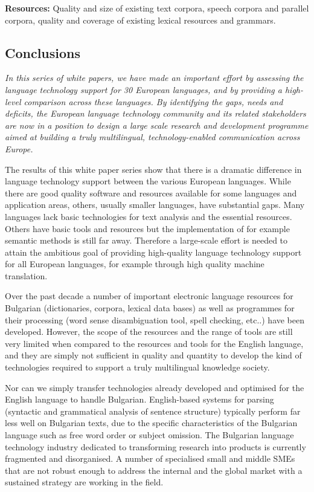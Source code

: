 \documentclass[]{../../metanetpaper}
\begin{document}
\begin{multicols}{2}
\textbf{Resources:} Quality and size of existing text corpora, speech corpora and parallel corpora, quality and coverage of existing lexical resources and grammars.

\subsection{Conclusions}

\emph{In this series of white papers, we have made an important effort by assessing the language technology support for 30 European languages, and by providing a high-level comparison across these languages. By identifying the gaps, needs and deficits, the European language technology community and its related stakeholders are now in a position to design a large scale research and development programme aimed at building a truly multilingual, technology-enabled communication across Europe.}

The results of this white paper series show that there is a dramatic difference in language technology support between the various European languages. While there are good quality software and resources available for some languages and application areas, others, usually smaller languages, have substantial gaps. Many languages lack basic technologies for text analysis and the essential resources. Others have basic tools and resources but the implementation of for example semantic methods is still far away. Therefore a large-scale effort is needed to attain the ambitious goal of providing high-quality language technology support for all European languages, for example through high quality machine translation. 

Over the past decade a number of important electronic language resources for Bulgarian (dictionaries, corpora, lexical data bases) as well as programmes for their processing (word sense disambiguation tool, spell checking, etc..) have been developed. However, the scope of the resources and the range of tools are still very limited when compared to the resources and tools for the English language, and they are simply not sufficient in quality and quantity to develop the kind of technologies required to support a truly multilingual knowledge society.

Nor can we simply transfer technologies already developed and optimised for the English language to handle Bulgarian. English-based systems for parsing (syntactic and grammatical analysis of sentence structure) typically perform far less well on Bulgarian texts, due to the specific characteristics of the Bulgarian language such as free word order or subject omission.
The Bulgarian language technology industry dedicated to transforming research into products is currently fragmented and disorganised. A number of specialised small and middle SMEs that are not robust enough to address the internal and the global market with a sustained strategy are working in the field.


\end{multicols}
\end{document}
